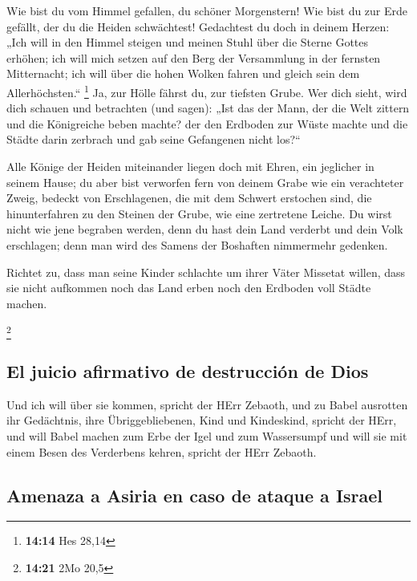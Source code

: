  Wie bist du vom Himmel gefallen, du schöner Morgenstern!
Wie bist du zur Erde gefällt, der du die Heiden schwächtest!
 Gedachtest du doch in deinem Herzen: „Ich will in den
Himmel steigen und meinen Stuhl über die Sterne Gottes erhöhen;
 ich will mich setzen auf den Berg der Versammlung in der
fernsten Mitternacht; ich will über die hohen Wolken fahren und gleich
sein dem Allerhöchsten.`` \footnote{\textbf{14:14} Hes 28,14}
 Ja, zur Hölle fährst du, zur tiefsten Grube.
 Wer dich sieht, wird dich schauen und betrachten (und
sagen): „Ist das der Mann, der die Welt zittern und die Königreiche
beben machte?  der den Erdboden zur Wüste machte und die
Städte darin zerbrach und gab seine Gefangenen nicht los?{}``

 Alle Könige der Heiden miteinander liegen doch mit
Ehren, ein jeglicher in seinem Hause;  du aber bist
verworfen fern von deinem Grabe wie ein verachteter Zweig, bedeckt von
Erschlagenen, die mit dem Schwert erstochen sind, die hinunterfahren zu
den Steinen der Grube, wie eine zertretene Leiche.  Du
wirst nicht wie jene begraben werden, denn du hast dein Land verderbt
und dein Volk erschlagen; denn man wird des Samens der Boshaften
nimmermehr gedenken.

 Richtet zu, dass man seine Kinder schlachte um ihrer
Väter Missetat willen, dass sie nicht aufkommen noch das Land erben noch
den Erdboden voll Städte machen.

\footnote{\textbf{14:21} 2Mo 20,5}

\hypertarget{el-juicio-afirmativo-de-destrucciuxf3n-de-dios}{%
\subsection{El juicio afirmativo de destrucción de
Dios}\label{el-juicio-afirmativo-de-destrucciuxf3n-de-dios}}

 Und ich will über sie kommen, spricht der HErr Zebaoth,
und zu Babel ausrotten ihr Gedächtnis, ihre Übriggebliebenen, Kind und
Kindeskind, spricht der HErr,  und will Babel machen zum
Erbe der Igel und zum Wassersumpf und will sie mit einem Besen des
Verderbens kehren, spricht der HErr Zebaoth.

\hypertarget{amenaza-a-asiria-en-caso-de-ataque-a-israel}{%
\subsection{Amenaza a Asiria en caso de ataque a
Israel}\label{amenaza-a-asiria-en-caso-de-ataque-a-israel}}

